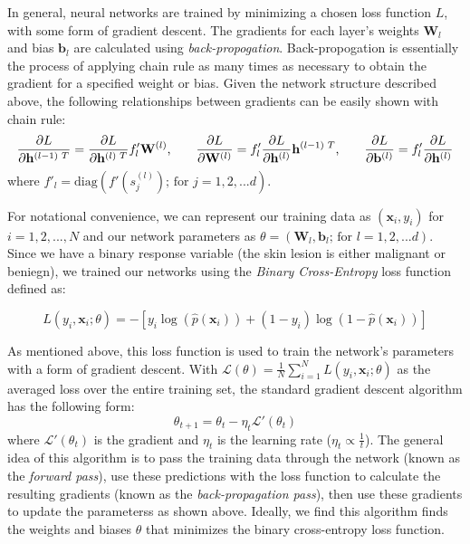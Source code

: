 \documentclass [MAS] {uclathes}
\begin{document}
In general, neural networks are trained by minimizing a chosen loss function $L$, with some form of gradient descent. The gradients for each layer's weights $\mathbf{W}_l$ and bias $\mathbf{b}_l$ are calculated using \textit{back-propogation}. Back-propogation is essentially the process of applying chain rule as many times as necessary to obtain the gradient for a specified weight or bias. Given the network structure described above, the following relationships between gradients can be easily shown with chain rule:
$$\frac{\partial L}{\partial \mathbf{h}^{(l-1) \text{ }T}} = \frac{\partial L}{\partial \mathbf{h}^{(l) \text{ }T}} f'_{l} \mathbf{W}^{(l)} \text{,\quad \quad} \frac{\partial L}{\partial \mathbf{W}^{(l)}} = f'_{l} \frac{\partial L}{\partial \mathbf{h}^{(l)}}\mathbf{h}^{(l-1) \text{ }T} \text{,\quad \quad} \frac{\partial L}{\partial \mathbf{b}^{(l)}} = f'_{l} \frac{\partial L}{\partial \mathbf{h}^{(l)}}$$ where $f'_{l} = \text{diag}(f'(s^{(l)}_{j})  \text{; for } j = 1, 2, ... d)$.


For notational convenience, we can represent our training data as $(\mathbf{x}_i, y_i)$ for $i = 1, 2, ..., N$ and our network parameters as $\theta = (\mathbf{W}_l, \mathbf{b}_l  \text{; for } l = 1, 2, ... d)$. Since we have a binary response variable (the skin lesion is either malignant or beniegn), we trained our networks using the \textit{Binary Cross-Entropy} loss function defined as: 

$$L(y_i, \mathbf{x}_i; \theta) = - \left[ y_i\log(\hat{p}(\mathbf{x}_i)) + (1 - y_i)\log(1 - \hat{p}(\mathbf{x}_i)) \right]$$ 

As mentioned above, this loss function is used to train the network's parameters with a form of gradient descent. With $\mathcal{L}(\theta) = \frac{1}{N} \sum_{i=1}^{N} L(y_i, \mathbf{x}_i; \theta)$ as the averaged loss over the entire training set, the standard gradient descent algorithm has the following form: $$\theta_{t+1} = \theta_{t} - \eta_t \mathcal{L}'(\theta_t)$$ where $\mathcal{L}'(\theta_t)$ is the gradient and $\eta_t$ is the learning rate ($\eta_t \propto \frac{1}{t}$). The general idea of this algorithm is to pass the training data through the network (known as the \textit{forward pass}), use these predictions with the loss function to calculate the resulting gradients (known as the \textit{back-propagation pass}), then use these gradients to update the parameterss as shown above. Ideally, we find this algorithm finds the weights and biases $\theta$ that minimizes the binary cross-entropy loss function. 
\end{document}

